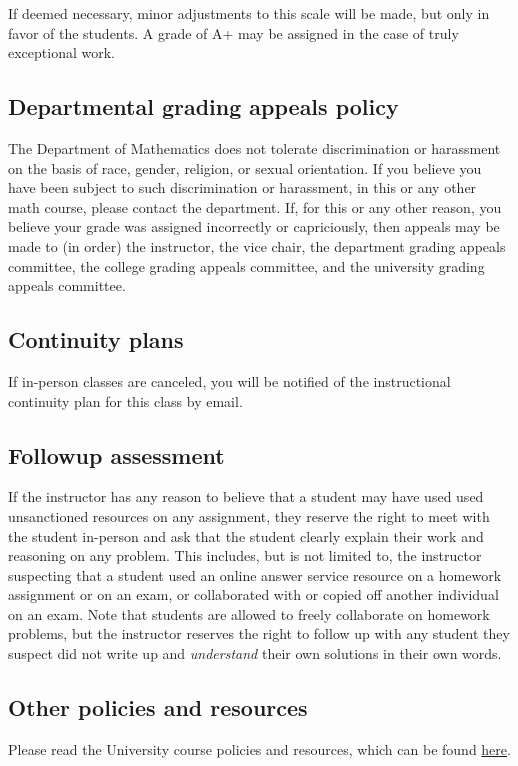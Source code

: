 \documentclass[12pt]{amsart}
\begin{document}
\noindent
If deemed necessary, minor adjustments to this scale will be made, but only in favor of the students. A grade of A+ may be assigned in the case of truly exceptional work.

\subsection*{Departmental grading appeals policy} 
The Department of Mathematics does not tolerate discrimination or harassment on the basis of race, gender, religion, or sexual orientation. If you believe you have been subject to such discrimination or harassment, in this or any other math course, please contact the department. If, for this or any other reason, you believe your grade was assigned incorrectly or capriciously, then appeals may be made to (in order) the instructor, the vice chair, the department grading appeals committee, the college grading appeals committee, and the university grading appeals committee.


\subsection*{Continuity plans} 
If in-person classes are canceled, you will be notified of the instructional continuity plan for this class by email.

\subsection*{Followup assessment} If the instructor has any reason to believe that a student may have used used unsanctioned resources on any assignment, they reserve the right to meet with the student in-person and ask that the student clearly explain their work and reasoning on any problem. This includes, but is not limited to, the instructor suspecting that a student used an online answer service resource on a homework assignment or on an exam, or collaborated with or copied off another individual on an exam. Note that students are allowed to freely collaborate on homework problems, but the instructor reserves the right to follow up with any student they suspect did not write up and \emph{understand} their own solutions in their own words.

\subsection*{Other policies and resources}

Please read the University course policies and resources, which can be found \href{https://executivevc.unl.edu/academic-excellence/teaching-resources/course-policies}{here}.
\end{document}
